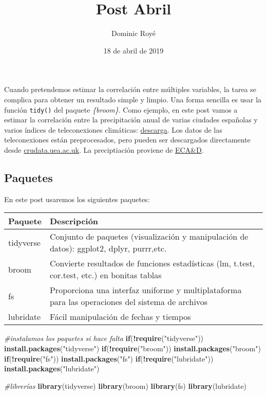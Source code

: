 \documentclass[]{article}
\title{Post Abril}
\author{Dominic Royé}
\date{18 de abril de 2019}
\newenvironment{Shaded}{\begin{snugshade}}{\end{snugshade}}
\newcommand{\KeywordTok}[1]{\textcolor[rgb]{0.13,0.29,0.53}{\textbf{#1}}}
\newcommand{\StringTok}[1]{\textcolor[rgb]{0.31,0.60,0.02}{#1}}
\newcommand{\CommentTok}[1]{\textcolor[rgb]{0.56,0.35,0.01}{\textit{#1}}}
\newcommand{\ControlFlowTok}[1]{\textcolor[rgb]{0.13,0.29,0.53}{\textbf{#1}}}
\newcommand{\OperatorTok}[1]{\textcolor[rgb]{0.81,0.36,0.00}{\textbf{#1}}}
\newcommand{\NormalTok}[1]{#1}
\begin{document}
\maketitle

Cuando pretendemos estimar la correlación entre múltiples variables, la
tarea se complica para obtener un resultado simple y limpio. Una forma
sencilla es usar la función \texttt{tidy()} del paquete
\emph{\{broom\}}. Como ejemplo, en este post vamos a estimar la
correlación entre la precipitación anual de varias ciudades españolas y
varios índices de teleconexiones climáticas:
\href{/files/teleconnections_indices.zip}{descarga}. Los datos de las
teleconexiones están preprocesados, pero pueden ser descargados
directamente desde
\href{https://crudata.uea.ac.uk/cru/data/pci.htm}{crudata.uea.ac.uk}. La
preciptiación proviene de
\href{https://www.ecad.eu//dailydata/index.php}{ECA\&D}.

\subsection{Paquetes}\label{paquetes}

En este post usaremos los siguientes paquetes:

\begin{longtable}[]{@{}ll@{}}
\toprule
Paquete & Descripción\tabularnewline
\midrule
\endhead
tidyverse & Conjunto de paquetes (visualización y manipulación de
datos): ggplot2, dplyr, purrr,etc.\tabularnewline
broom & Convierte resultados de funciones estadísticas (lm, t.test,
cor.test, etc.) en bonitas tablas\tabularnewline
fs & Proporciona una interfaz uniforme y multiplataforma para las
operaciones del sistema de archivos\tabularnewline
lubridate & Fácil manipulación de fechas y tiempos\tabularnewline
\bottomrule
\end{longtable}

\begin{Shaded}
\begin{Highlighting}[]
\CommentTok{#instalamos los paquetes si hace falta}
\ControlFlowTok{if}\NormalTok{(}\OperatorTok{!}\KeywordTok{require}\NormalTok{(}\StringTok{"tidyverse"}\NormalTok{)) }\KeywordTok{install.packages}\NormalTok{(}\StringTok{"tidyverse"}\NormalTok{)}
\ControlFlowTok{if}\NormalTok{(}\OperatorTok{!}\KeywordTok{require}\NormalTok{(}\StringTok{"broom"}\NormalTok{)) }\KeywordTok{install.packages}\NormalTok{(}\StringTok{"broom"}\NormalTok{)}
\ControlFlowTok{if}\NormalTok{(}\OperatorTok{!}\KeywordTok{require}\NormalTok{(}\StringTok{"fs"}\NormalTok{)) }\KeywordTok{install.packages}\NormalTok{(}\StringTok{"fs"}\NormalTok{)}
\ControlFlowTok{if}\NormalTok{(}\OperatorTok{!}\KeywordTok{require}\NormalTok{(}\StringTok{"lubridate"}\NormalTok{)) }\KeywordTok{install.packages}\NormalTok{(}\StringTok{"lubridate"}\NormalTok{)}

\CommentTok{#librerías}
\KeywordTok{library}\NormalTok{(tidyverse)}
\KeywordTok{library}\NormalTok{(broom)}
\KeywordTok{library}\NormalTok{(fs)}
\KeywordTok{library}\NormalTok{(lubridate)}
\end{Highlighting}
\end{Shaded}
\end{document}
